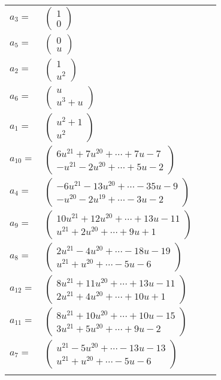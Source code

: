 \documentclass[1p]{elsarticle_modified}
\theoremstyle{definition}
\begin{document}
\begin{tabular}{m{7pt} m{180pt} m{7pt} m{180pt} }
\flushright $a_{3}=$&$\begin{pmatrix}1\\0\end{pmatrix}$ \\
\flushright $a_{5}=$&$\begin{pmatrix}0\\u\end{pmatrix}$ \\
\flushright $a_{2}=$&$\begin{pmatrix}1\\u^2\end{pmatrix}$ \\
\flushright $a_{6}=$&$\begin{pmatrix}u\\u^3+u\end{pmatrix}$ \\
\flushright $a_{1}=$&$\begin{pmatrix}u^2+1\\u^2\end{pmatrix}$ \\
\flushright $a_{10}=$&$\begin{pmatrix}6 u^{21}+7 u^{20}+\cdots+7 u-7\\- u^{21}-2 u^{20}+\cdots+5 u-2\end{pmatrix}$ \\
\flushright $a_{4}=$&$\begin{pmatrix}-6 u^{21}-13 u^{20}+\cdots-35 u-9\\- u^{20}-2 u^{19}+\cdots-3 u-2\end{pmatrix}$ \\
\flushright $a_{9}=$&$\begin{pmatrix}10 u^{21}+12 u^{20}+\cdots+13 u-11\\u^{21}+2 u^{20}+\cdots+9 u+1\end{pmatrix}$ \\
\flushright $a_{8}=$&$\begin{pmatrix}2 u^{21}-4 u^{20}+\cdots-18 u-19\\u^{21}+u^{20}+\cdots-5 u-6\end{pmatrix}$ \\
\flushright $a_{12}=$&$\begin{pmatrix}8 u^{21}+11 u^{20}+\cdots+13 u-11\\2 u^{21}+4 u^{20}+\cdots+10 u+1\end{pmatrix}$ \\
\flushright $a_{11}=$&$\begin{pmatrix}8 u^{21}+10 u^{20}+\cdots+10 u-15\\3 u^{21}+5 u^{20}+\cdots+9 u-2\end{pmatrix}$ \\
\flushright $a_{7}=$&$\begin{pmatrix}u^{21}-5 u^{20}+\cdots-13 u-13\\u^{21}+u^{20}+\cdots-5 u-6\end{pmatrix}$\\&\end{tabular}
\end{document}
